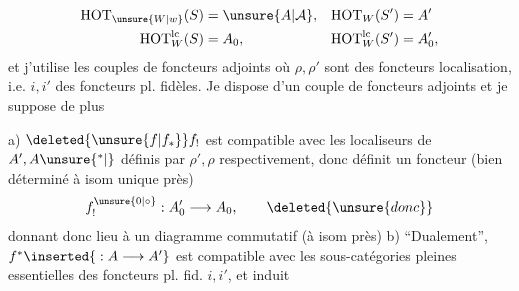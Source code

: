 \[
 \begin{aligned}
 \mathrm{HOT}_{\unsure{W|w}}(S)&=\unsure{A|\mathcal{A}},&\mathrm{HOT}_W(S')&=A'\\
 \mathrm{HOT}^{\mathrm{lc}}_W(S)&=A_0,&\mathrm{HOT}^{\mathrm{lc}}_W(S')&=A'_0,
 \end{aligned}
\]
et j'utilise les couples de foncteurs adjoints
où $\rho,\rho'$ sont des foncteurs  localisation, i.e. $i,i'$ des foncteurs pl. fidèles.  Je dispose d'un couple de foncteurs adjoints
et je suppose  de plus

a) $\deleted{\unsure{f|f_*}} f_!$ est compatible avec les localiseurs de $A',A\unsure{{}^{*}|{}}$ définis par $\rho',\rho$ respectivement, donc définit un foncteur (bien déterminé à isom unique près)
\[
 f_!^{\unsure{0|\circ}}:A'_0\longrightarrow A_0,\qquad\deleted{\unsure{donc}}
\]
 donnant donc lieu à un diagramme commutatif (à isom  près)
b) ``Dualement'', $f^*\inserted{{}:A\longrightarrow A'}$ est compatible avec les sous-catégories pleines   essentielles des foncteurs pl. fid. $i,i'$, et induit
